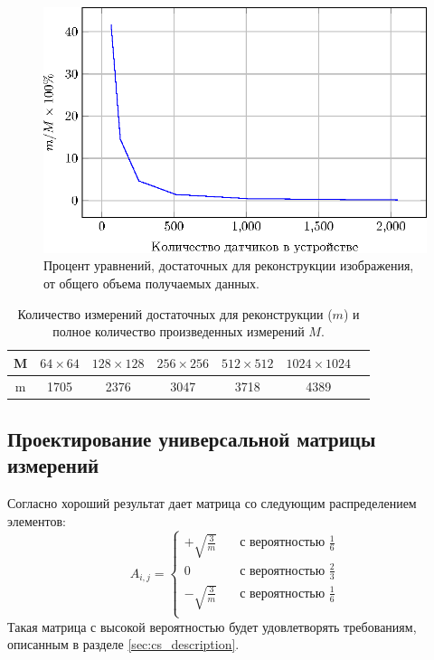 \documentclass[14pt]{matmex-diploma-custom}
\begin{document}
\begin{figure}[h]
    \centering
    \includegraphics[width=0.8\linewidth]{pics_eps/percents_estimation.eps}
    \caption{\small Процент уравнений, достаточных для реконструкции изображения, от общего объема получаемых данных.}
    \label{fig:percents_est}
\end{figure}

\begin{table}[h]
\centering
\begin{tabular}{| c | c | c | c | c | c | c |}
    \hline
    M & $64\times 64$ & $128\times 128$ & $256\times 256$ & $512\times 512$ & $1024\times 1024$  \\
    \hline
    m & 1705 & 2376 & 3047 & 3718 & 4389 \\
    \hline
\end{tabular}
\caption{\small Количество измерений достаточных для реконструкции ($m$) и полное количество произведенных измерений $M$.}
\label{table:m_computed}
\end{table}

\subsection{Проектирование универсальной матрицы \\измерений}
Согласно \cite{baraniuk2008simple} хороший результат дает матрица со следующим распределением элементов:
\[ A_{i,j} =
  \begin{cases}
    +\sqrt{\frac{3}{m}}      & \quad \text{с вероятностью } \frac{1}{6}\\
    0   & \quad \text{с вероятностью } \frac{2}{3}\\
    -\sqrt{\frac{3}{m}}       & \quad \text{с вероятностью } \frac{1}{6}\\
  \end{cases}
\]
Такая матрица с высокой вероятностью будет удовлетворять требованиям, описанным в разделе \ref{sec:cs_description}.\\
\end{document}
